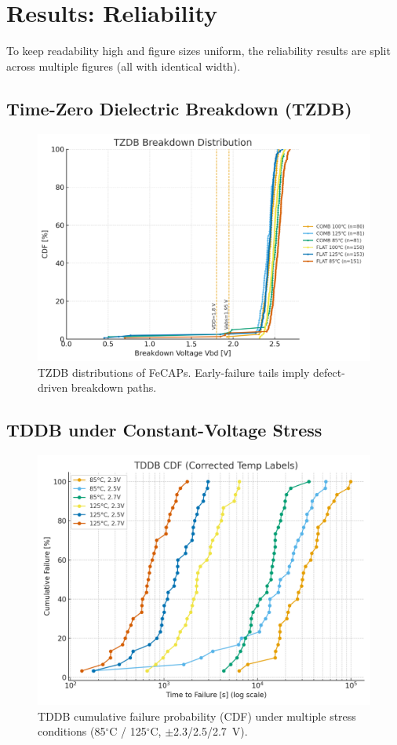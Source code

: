 \documentclass[conference]{IEEEtran}
\begin{document}
\section{Results: Reliability}
To keep readability high and figure sizes uniform, the reliability results are split across multiple figures (all with identical width).

\subsection{Time-Zero Dielectric Breakdown (TZDB)}
\begin{figure}[!t]
  \centering
  \includegraphics[width=0.95\linewidth]{figures/fig3_tzdb.png}
  \caption{TZDB distributions of FeCAPs. Early-failure tails imply defect-driven breakdown paths.}
  \label{fig:tzdb}
\end{figure}

\subsection{TDDB under Constant-Voltage Stress}
\begin{figure}[!t]
  \centering
  \includegraphics[width=0.95\linewidth]{figures/fig4_tddb_cdf.png}
  \caption{TDDB cumulative failure probability (CDF) under multiple stress conditions (85$^\circ$C / 125$^\circ$C, $\pm$2.3/2.5/2.7~V).}
  \label{fig:tddb_cdf}
\end{figure}
\end{document}
